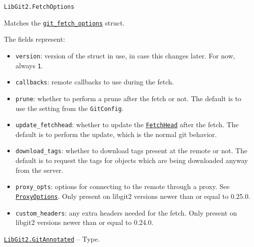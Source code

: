 \begin{adjustwidth}{2em}{0pt}


\begin{verbatim}
LibGit2.FetchOptions
\end{verbatim}

Matches the \href{https://libgit2.org/libgit2/\#HEAD/type/git\_fetch\_options}{\texttt{git\_fetch\_options}} struct.

The fields represent:

\begin{itemize}
\item \texttt{version}: version of the struct in use, in case this changes later. For now, always \texttt{1}.


\item \texttt{callbacks}: remote callbacks to use during the fetch.


\item \texttt{prune}: whether to perform a prune after the fetch or not. The default is to  use the setting from the \texttt{GitConfig}.


\item \texttt{update\_fetchhead}: whether to update the \hyperlink{17806809481919147110}{\texttt{FetchHead}} after the fetch.  The default is to perform the update, which is the normal git behavior.


\item \texttt{download\_tags}: whether to download tags present at the remote or not. The default  is to request the tags for objects which are being downloaded anyway from the server.


\item \texttt{proxy\_opts}: options for connecting to the remote through a proxy. See \hyperlink{1179613637206861638}{\texttt{ProxyOptions}}.  Only present on libgit2 versions newer than or equal to 0.25.0.


\item \texttt{custom\_headers}: any extra headers needed for the fetch. Only present on libgit2 versions  newer than or equal to 0.24.0.

\end{itemize}


\end{adjustwidth}
\hypertarget{9263689983564368210}{} 
\hyperlink{9263689983564368210}{\texttt{LibGit2.GitAnnotated}}  -- {Type.}

